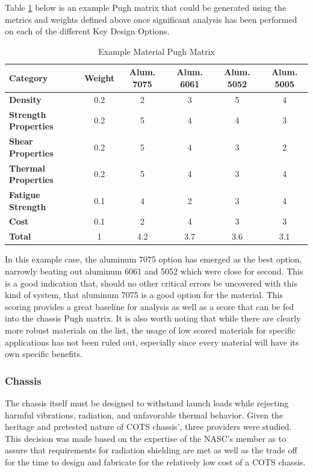 Table \ref{tbl:material_Pugh} below is an example Pugh matrix that could be generated using the metrics and weights defined above once significant analysis has been performed on each of the different Key Design Options. 
\begin{table}[H]
\centering
\begin{tabular}{|l|c|c|c|c|c|} 
\hline
    \textbf{Category} & \textbf{Weight} & \textbf{Alum. 7075} & \textbf{Alum. 6061} & \textbf{Alum. 5052} & \textbf{Alum. 5005}
    \\
\hline
    \textbf{Density} & 0.2 & 2 & 3 & 5 & 4
    \\
\hline
    \textbf{Strength Properties} & 0.2 & 5 & 4 & 4 & 3 
    \\
\hline
    \textbf{Shear Properties} & 0.2 & 5 & 4 & 3 & 2 
    \\
\hline
    \textbf{Thermal Properties} & 0.2 & 5 & 4 & 3 & 4
    \\
\hline
    \textbf{Fatigue Strength} & 0.1 & 4 & 2 & 3 & 4 
    \\
\hline
    \textbf{Cost} & 0.1 & 2 & 4 & 3 & 3 
    \\
\hline
    \textbf{Total} & 1 & 4.2 & 3.7 & 3.6 & 3.1 
    \\
\hline
\end{tabular}
\caption{Example Material Pugh Matrix }
\label{tbl:material_Pugh}
\end{table}

In this example case, the aluminum 7075 option has emerged as the best option, narrowly beating out aluminum 6061 and 5052 which were close for second. This is a good indication that, should no other critical errors be uncovered with this kind of system, that aluminum 7075 is a good option for the material. This scoring provides a great baseline for analysis as well as a score that can be fed into the chassis Pugh matrix. It is also worth noting that while there are clearly more robust materials on the list, the usage of low scored materials for specific applications has not been ruled out, especially since every material will have its own specific benefits.

\subsubsection{Chassis}
The chassis itself must be designed to withstand launch loads while rejecting harmful vibrations, radiation, and unfavorable thermal behavior. Given the heritage and pretested nature of COTS chassis', three providers were studied. This decision was made based on the expertise of the NASC's member as to assure that requirements for radiation shielding are met as well as the trade off for the time to design and fabricate for the relatively low cost of a COTS chassis. 
